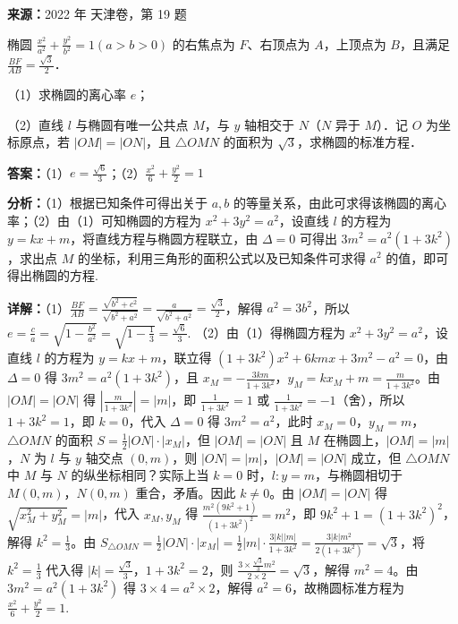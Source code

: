 \begin{question}[points=15]
\textbf{来源：}2022 年 天津卷，第 19 题\par
椭圆 $\frac{x^2}{a^2}+\frac{y^2}{b^2}=1(a>b>0)$ 的右焦点为 $F$、右顶点为 $A$，上顶点为 $B$，且满足 $\frac{BF}{AB}=\frac{\sqrt{3}}{2}$．

（1）求椭圆的离心率 $e$；

（2）直线 $l$ 与椭圆有唯一公共点 $M$，与 $y$ 轴相交于 $N$（$N$ 异于 $M$）．记 $O$ 为坐标原点，若 $|OM|=|ON|$，且 $\triangle OMN$ 的面积为 $\sqrt{3}$，求椭圆的标准方程．
\begin{solution}
\textbf{答案：}（1）$e=\frac{\sqrt{6}}{3}$；（2）$\frac{x^2}{6}+\frac{y^2}{2}=1$

\textbf{分析：}（1）根据已知条件可得出关于 $a,b$ 的等量关系，由此可求得该椭圆的离心率；（2）由（1）可知椭圆的方程为 $x^2+3y^2=a^2$，设直线 $l$ 的方程为 $y=kx+m$，将直线方程与椭圆方程联立，由 $\Delta=0$ 可得出 $3m^2=a^2(1+3k^2)$，求出点 $M$ 的坐标，利用三角形的面积公式以及已知条件可求得 $a^2$ 的值，即可得出椭圆的方程.

\textbf{详解：}（1）$\frac{BF}{AB}=\frac{\sqrt{b^2+c^2}}{\sqrt{b^2+a^2}}=\frac{a}{\sqrt{b^2+a^2}}=\frac{\sqrt{3}}{2}$，解得 $a^2=3b^2$，所以 $e=\frac{c}{a}=\sqrt{1-\frac{b^2}{a^2}}=\sqrt{1-\frac{1}{3}}=\frac{\sqrt{6}}{3}$.
（2）由（1）得椭圆方程为 $x^2+3y^2=a^2$，设直线 $l$ 的方程为 $y=kx+m$，联立得 $(1+3k^2)x^2+6kmx+3m^2-a^2=0$，由 $\Delta=0$ 得 $3m^2=a^2(1+3k^2)$，且 $x_M=-\frac{3km}{1+3k^2}$，$y_M=kx_M+m=\frac{m}{1+3k^2}$。由 $|OM|=|ON|$ 得 $|\frac{m}{1+3k^2}|=|m|$，即 $\frac{1}{1+3k^2}=1$ 或 $\frac{1}{1+3k^2}=-1$（舍），所以 $1+3k^2=1$，即 $k=0$，代入 $\Delta=0$ 得 $3m^2=a^2$，此时 $x_M=0$，$y_M=m$，$\triangle OMN$ 的面积 $S=\frac{1}{2}|ON|\cdot|x_M|$，但 $|OM|=|ON|$ 且 $M$ 在椭圆上，$|OM|=|m|$，$N$ 为 $l$ 与 $y$ 轴交点 $(0,m)$，则 $|ON|=|m|$，$|OM|=|ON|$ 成立，但 $\triangle OMN$ 中 $M$ 与 $N$ 的纵坐标相同？实际上当 $k=0$ 时，$l:y=m$，与椭圆相切于 $M(0,m)$，$N(0,m)$ 重合，矛盾。因此 $k\neq0$。由 $|OM|=|ON|$ 得 $\sqrt{x_M^2+y_M^2}=|m|$，代入 $x_M,y_M$ 得 $\frac{m^2(9k^2+1)}{(1+3k^2)^2}=m^2$，即 $9k^2+1=(1+3k^2)^2$，解得 $k^2=\frac{1}{3}$。由 $S_{\triangle OMN}=\frac{1}{2}|ON|\cdot|x_M|=\frac{1}{2}|m|\cdot\frac{3|k||m|}{1+3k^2}=\frac{3|k|m^2}{2(1+3k^2)}=\sqrt{3}$，将 $k^2=\frac{1}{3}$ 代入得 $|k|=\frac{\sqrt{3}}{3}$，$1+3k^2=2$，则 $\frac{3\times\frac{\sqrt{3}}{3}m^2}{2\times2}=\sqrt{3}$，解得 $m^2=4$。由 $3m^2=a^2(1+3k^2)$ 得 $3\times4=a^2\times2$，解得 $a^2=6$，故椭圆标准方程为 $\frac{x^2}{6}+\frac{y^2}{2}=1$.
\end{solution}
\end{question}

